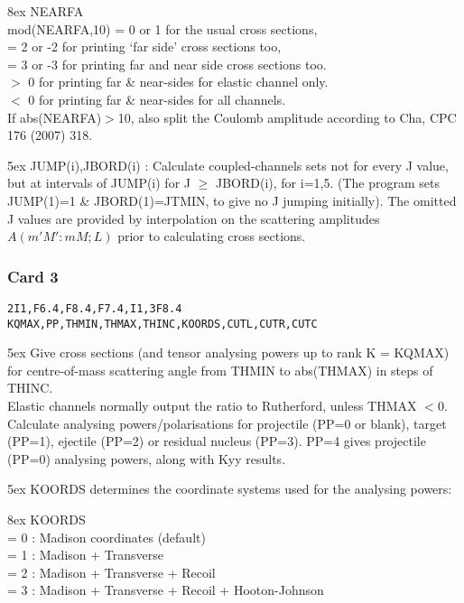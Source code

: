 \documentclass[11pt]{article}
\begin{document}
\hangindent 8ex  NEARFA
\\  mod(NEARFA,10) = 0 or 1 for the usual cross sections,
\\  = 2 or -2 for printing `far side' cross sections too,
\\  = 3 or -3 for printing far and near side cross sections too.
\\  $>$ 0 for printing far \& near-sides for elastic channel only.
\\  $<$ 0 for printing far \& near-sides for all channels.\\
If abs(NEARFA)$>$10, also split the Coulomb amplitude according to Cha, CPC 176 (2007) 318.




\hangindent 5ex
JUMP(i),JBORD(i) : Calculate coupled-channels sets not for every J
value, but at intervals of JUMP(i) for J $\geq$ JBORD(i), for i=1,5.
(The program sets JUMP(1)=1 \& JBORD(1)=JTMIN, to give no J jumping initially).
The omitted J values are provided by interpolation on the scattering
amplitudes $A(m'M':mM; L)$ prior to calculating cross sections.

\subsubsection*{Card 3}
\begin{verbatim}
2I1,F6.4,F8.4,F7.4,I1,3F8.4  KQMAX,PP,THMIN,THMAX,THINC,KOORDS,CUTL,CUTR,CUTC
\end{verbatim}


\hangindent 5ex
Give cross sections (and tensor analysing powers up to rank K = KQMAX)
for centre-of-mass scattering angle from THMIN
to abs(THMAX) in steps of THINC.\\
Elastic channels normally output the ratio to Rutherford, unless THMAX $< 0$.\\
Calculate analysing powers/polarisations for projectile (PP=0 or blank),
target (PP=1), ejectile (PP=2) or residual nucleus (PP=3).
PP=4 gives projectile (PP=0) analysing powers, along with Kyy results.

\hangindent 5ex
KOORDS determines the coordinate systems used for the analysing powers:

\hangindent 8ex  KOORDS
\\  = 0 : Madison coordinates (default)
\\  = 1 : Madison + Transverse
\\  = 2 : Madison + Transverse + Recoil
\\  = 3 : Madison + Transverse + Recoil + Hooton-Johnson
\end{document}
